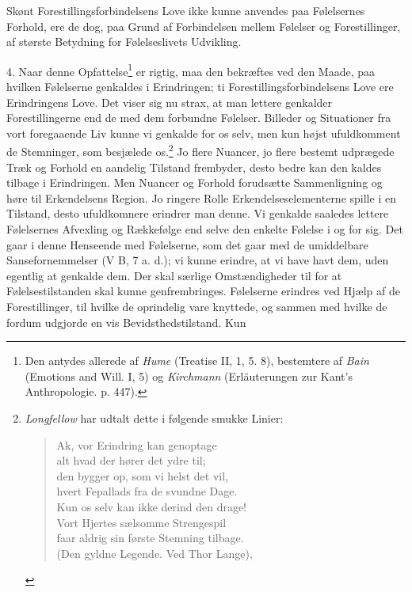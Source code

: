 \documentclass[12pt,a4paper,openany]{book}
\newcommand{\opage}[1]{\marginnote{\footnotesize\textit{[#1]}}}
\begin{document}
Skønt Forestillingsforbindelsens Love ikke kunne anvendes paa
Følelsernes Forhold, ere de dog, paa Grund af Forbindelsen mellem
Følelser og Forestillinger, af største Betydning for Følelseslivets
Udvikling.

4. Naar denne Opfattelse\footnote[1]{Den antydes allerede af \emph{Hume}
(Treatise II, 1, 5. 8), bestemtere af \emph{Bain} (Emotions and Will. I,
5) og \emph{Kirchmann} (Erläuterungen zur Kant’s Anthropologie. p.
447).} er rigtig, maa den bekræftes ved den Maade, paa hvilken
Følelserne genkaldes i Erindringen; ti Forestillingsforbindelsens Love
ere Erindringens Love. Det
\opage{291}viser sig nu strax, at man lettere genkalder Forestillingerne
end de med dem forbundne Følelser. Billeder og Situationer fra vort
foregaaende Liv kunne vi genkalde for os selv, men kun højst
ufuldkomment de Stemninger, som besjælede os.\footnote[1]{\emph{Longfellow} har udtalt dette i følgende smukke Linier:
\begin{verse}
Ak, vor Erindring kan genoptage\\
alt hvad der hører det ydre til;\\
den bygger op, som vi helst det vil,\\
hvert Fepallads fra de svundne Dage.%
\\
Kun os selv kan ikke derind den drage!\\
Vort Hjertes sælsomme Strengespil\\
faar aldrig sin første Stemning tilbage.\\
\hspace*{3em}(Den gyldne Legende. Ved Thor Lange),%
\end{verse}} Jo flere Nuancer, jo
flere bestemt udprægede Træk og Forhold en aandelig Tilstand frembyder,
desto bedre kan den kaldes tilbage i Erindringen. Men Nuancer og Forhold
forudsætte Sammenligning og høre til Erkendelsens Region. Jo ringere
Rolle Erkendelseselementerne spille i en Tilstand, desto ufuldkomnere
erindrer man denne. Vi genkalde saaledes lettere Følelsernes Afvexling
og Rækkefølge end selve den enkelte Følelse i og for sig. Det gaar i
denne Henseende med Følelserne, som det gaar med de umiddelbare
Sansefornemmelser (V B, 7 a. d.); vi kunne erindre, at vi have havt dem,
uden egentlig at genkalde dem. Der skal særlige Omstændigheder til for
at Følelsestilstanden skal kunne genfrembringes. Følelserne erindres ved
Hjælp af de Forestillinger, til hvilke de oprindelig vare knyttede, og
sammen med hvilke de fordum udgjorde en vis Bevidsthedstilstand. Kun
\end{document}
